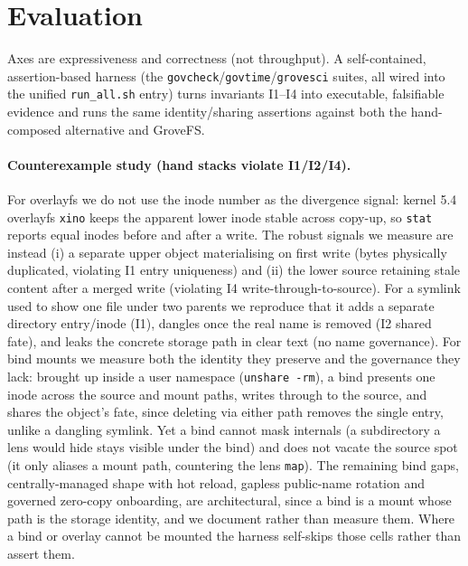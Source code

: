 \documentclass[numberedsection,acmtos]{acmart}
\begin{document}
\section{Evaluation}
\label{sec:eval}
Axes are expressiveness and correctness (not throughput). A self-contained,
assertion-based harness (the \texttt{govcheck}/\texttt{govtime}/\texttt{grovesci}
suites, all wired into the unified \texttt{run\_all.sh} entry) turns invariants
I1--I4 into executable, falsifiable evidence and runs the same identity/sharing
assertions against both the hand-composed alternative and GroveFS.

\paragraph{Counterexample study (hand stacks violate I1/I2/I4).}
For overlayfs we do not use the inode number as the
divergence signal: kernel 5.4 overlayfs \texttt{xino} keeps the apparent lower
inode stable across copy-up, so \texttt{stat} reports equal inodes before and
after a write. The robust signals we measure are instead (i) a separate upper
object materialising on first write (bytes physically duplicated, violating I1
entry uniqueness) and (ii) the lower source retaining stale content after a
merged write (violating I4 write-through-to-source). For a symlink used to show
one file under two parents we reproduce that it adds a separate directory
entry/inode (I1), dangles once the real name is removed (I2 shared fate), and
leaks the concrete storage path in clear text (no name governance). For bind
mounts we measure both the identity they preserve and the governance they lack:
brought up inside a user namespace (\texttt{unshare -rm}), a bind presents one
inode across the source and mount paths, writes through to the source, and
shares the object's fate, since deleting via either path removes the single
entry, unlike a dangling symlink. Yet a bind cannot mask internals (a
subdirectory a lens would hide stays visible under the bind) and does not vacate
the source spot (it only aliases a mount path, countering the lens
\texttt{map}). The remaining bind gaps, centrally-managed shape with hot reload,
gapless public-name rotation and governed zero-copy onboarding, are
architectural, since a bind is a mount whose path is the storage identity, and
we document rather than measure them. Where a bind or overlay cannot be mounted
the harness self-skips those cells rather than assert them.
\end{document}
